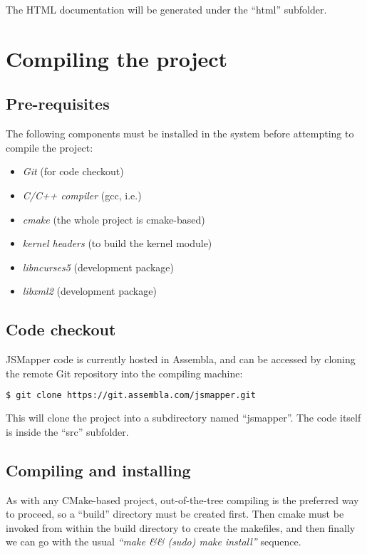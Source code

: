The HTML documentation will be generated under the ``html'' subfolder.


\section{Compiling the project}\label{section:compiling}
\subsection{Pre-requisites}
The following components must be installed in the system before attempting to compile the project:
\begin{itemize}
	\item \emph{Git} (for code checkout)
	\item \emph{C/C++ compiler} (gcc, i.e.)
	\item \emph{cmake} (the whole project is cmake-based)
	\item \emph{kernel headers} (to build the kernel module)
	\item \emph{libncurses5} (development package)
	\item \emph{libxml2} (development package)
\end{itemize}

\subsection{Code checkout}
JSMapper code is currently hosted in Assembla, and can be accessed by cloning the remote Git repository into the compiling machine:
\begin{lstlisting}[language=bash,caption={Checking out the code},label={lst:jsmapper_checkout}]
$ git clone https://git.assembla.com/jsmapper.git
\end{lstlisting}

This will clone the project into a subdirectory named ``jsmapper''. The code itself is inside the ``src'' subfolder.

\subsection{Compiling and installing}
As with any CMake-based project, out-of-the-tree compiling is the preferred way to proceed, so a ``build'' directory must be created first. Then cmake must be invoked from within the build directory to create the makefiles, and then finally we can go with the usual \emph{``make \&\& (sudo) make install''} sequence.

